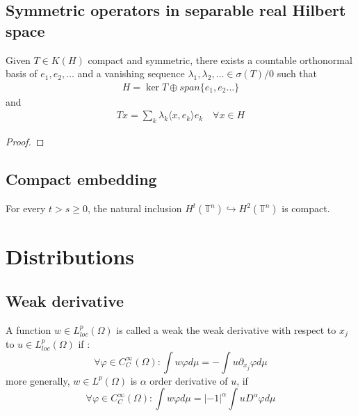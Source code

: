 \subsection{Symmetric operators in separable real Hilbert space}
\begin{theorem}
	Given $T \in K(H)$ compact and symmetric, there exists a countable orthonormal basis of $e_1, e_2, \dots$ and a vanishing sequence $\lambda_1, \lambda_2, \dots \in \sigma(T)\slash 0 $ such that 
	\begin{align*}
		H = \ker T \oplus span\{e_1, e_2 \dots \}
	\end{align*}
	and 
	\begin{align*}
		Tx = \sum_k \lambda_k \langle x, e_k\rangle e_k \quad \forall x \in H
	\end{align*}
\end{theorem}
\begin{proof}
\end{proof}

\subsection{Compact embedding}
\begin{theorem}[Rellich-Kondrachov $p = 2$]
	For every $t > s \geq 0$, the natural inclusion $H^t(\mathbb{T}^n) \hookrightarrow H^2(\mathbb{T}^n)$ is compact. 
\end{theorem}






\newpage
\section{Distributions}
\subsection{Weak derivative}
\begin{definition}
	A function $w \in L^p_{loc}(\Omega)$ is called a weak the weak derivative with respect to $x_j$ to $u \in L^p_{loc}(\Omega)$ if :
	\begin{equation*}
		\forall \varphi \in C^\infty_C(\Omega): \int w \varphi d\mu = -\int u \partial_{x_j} \varphi d\mu  
	\end{equation*}
	more generally, $w \in L^p(\Omega)$ is $\alpha$ order derivative of $u$, if
	\begin{equation*}
		\forall \varphi \in C^\infty_C(\Omega): \int w \varphi d\mu = |-1|^\alpha \int u D^\alpha \varphi d\mu
	\end{equation*}
\end{definition}

